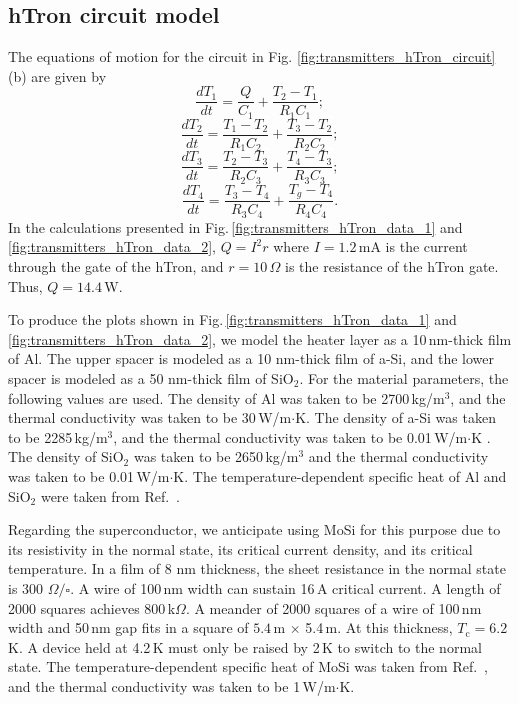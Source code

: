 \documentclass[twocolumn]{article}
\newcommand{\onlinecite}[1]{\hspace{-1 ex} \nocite{#1}\citenum{#1}}
\begin{document}
\subsection{hTron circuit model}
The equations of motion for the circuit in Fig. \ref{fig:transmitters_hTron_circuit}(b) are given by
\begin{equation}
\label{eq:hTron_eq01}
\frac{dT_1}{dt} = \frac{Q}{C_1} + \frac{T_2-T_1}{R_1C_1};
\end{equation}
\begin{equation}
\label{eq:hTron_eq02}
\frac{dT_2}{dt} = \frac{T_1-T_2}{R_1C_2} + \frac{T_3-T_2}{R_2C_2};
\end{equation}
\begin{equation}
\label{eq:hTron_eq03}
\frac{dT_3}{dt} = \frac{T_2-T_3}{R_2C_3} + \frac{T_4-T_3}{R_3C_3};
\end{equation}
\begin{equation}
\label{eq:hTron_eq04}
\frac{dT_4}{dt} = \frac{T_3-T_4}{R_3C_4} + \frac{T_g-T_4}{R_4C_4}.
\end{equation}
In the calculations presented in Fig.\,\ref{fig:transmitters_hTron_data_1} and \ref{fig:transmitters_hTron_data_2}, $Q = I^2r$ where $I = 1.2$\,mA is the current through the gate of the hTron, and $r = 10$\,$\Omega$ is the resistance of the hTron gate. Thus, $Q = 14.4$\,\textmu W.

To produce the plots shown in Fig.\,\ref{fig:transmitters_hTron_data_1} and \ref{fig:transmitters_hTron_data_2}, we model the heater layer as a 10\,nm-thick film of Al. The upper spacer is modeled as a 10 nm-thick film of a-Si, and the lower spacer is modeled as a 50 nm-thick film of SiO$_2$. For the material parameters, the following values are used. The density of Al was taken to be 2700\,kg/m$^3$, and the thermal conductivity was taken to be 30\,W/m$\cdot$K. The density of a-Si was taken to be 2285\,kg/m$^3$, and the thermal conductivity was taken to be 0.01\,W/m$\cdot$K \cite{zipi2006}. The density of SiO$_2$ was taken to be 2650\,kg/m$^3$ and the thermal conductivity was taken to be 0.01\,W/m$\cdot$K. The temperature-dependent specific heat of Al and SiO$_2$ were taken from Ref.\,\onlinecite{du2015}. 

Regarding the superconductor, we anticipate using MoSi for this purpose due to its resistivity in the normal state, its critical current density, and its critical temperature. In a film of 8 nm thickness, the sheet resistance in the normal state is 300 $\Omega/\square$. A wire of 100\,nm width can sustain 16\,\textmu A critical current. A length of 2000 squares achieves 800\,k$\Omega$. A meander of 2000 squares of a wire of 100\,nm width and 50\,nm gap fits in a square of $5.4$\,\textmu m $\times$ 5.4\,\textmu m. At this thickness, $T_{\mathrm{c}} = 6.2$\,K. A device held at 4.2\,K must only be raised by 2\,K to switch to the normal state. The temperature-dependent specific heat of MoSi was taken from Ref.\,\onlinecite{lasa1988}, and the thermal conductivity was taken to be 1\,W/m$\cdot$K.
\end{document}

